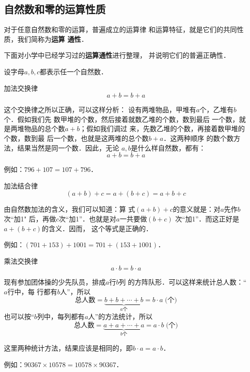 \subsection{自然数和零的运算性质}
对于任意自然数和零的运算，普遍成立的运算律
和运算特征，就是它们的共同性质，我们简称为\textbf{运算
	通性}．

下面对小学中已经学习过的\textbf{运算通性}进行整理，
并说明它们的普遍正确性．

设字母$a,  b,  c$都表示任一个自然数．

\begin{blk}{加法交换律}
	\[a+b=b+a \]
\end{blk}
\begin{note}
	这个交换律之所以正确，可以这样分析：
	设有两堆物品，甲堆有$a$个，乙堆有$b$个．假如我们先
	数甲堆的个数，然后接着就数乙堆的个数，数到最后
	一个数，就是两堆物品的总个数$a+b$；假如我们调过
	来，先数乙堆的个数，再接着数甲堆的个数，数到最
	后一个数，也就是这两堆的总个数$b+a$．这两种顺序
	的数个数方法，结果当然是同一个数．因此，无论
	$a, b$是什么样自然数，都有：
	\[a+b=b+a \]
	
	例如：$796+107=107+796$．
\end{note}


\begin{blk}{加法结合律}
	\[(a+b)+c=a+(b+c)=a+b+c \]
\end{blk}
\begin{note}
	由自然数加法的含义，我们可以知道：算
	式$(a+b) +c$的意义就是：对$a$先作$b$次“加1"
	后，再做$c$次“加1”．也就是对$a$一共要做$(b+c)$
	次“加1”．而这正好是$a+ (b+c)$的含义．因而，
	这个等式是正确的．
	
	例如：$(701+153)+1001 =701+(153+1001)$．
\end{note}


\begin{blk}{乘法交换律}
	\[a\cdot b=b\cdot a \]
\end{blk}
\begin{note}
	现有参加团体操的少先队员，排成$a$行$b$列
	的方阵队形．可以这样来统计总人数：“$a$行中，每
	行都有$b$人”，所以
	\[\text{总人数}=\underbrace{b+b+\cdots+b}_{a\text{个}}=b\cdot a \; \text{(个)} \]
	也可以按“$b$列中，每列都有$a$人”的方法统计，所以
	\[\text{总人数}=\underbrace{a+a+\cdots+a}_{b\text{个}}=a\cdot b \; \text{(个)} \]
	
	这里两种统计方法，结果应该是相同的，即$b\cdot a=a\cdot b$．
	
	例如：$90367 \times  10578=10578 \times  90367$．
\end{note}


